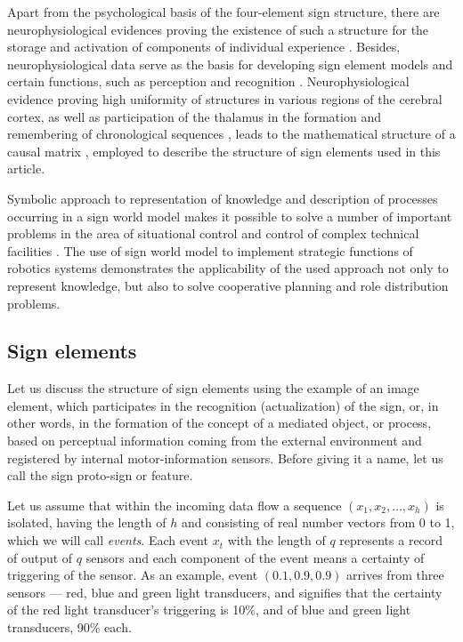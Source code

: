 \documentclass[review]{elsarticle}
\begin{document}
Apart from the psychological basis of the four-element sign structure, there are neurophysiological evidences proving the existence of such a structure for the storage and activation of components of individual experience \cite{Edelman1987,Ivanitsky1997}. Besides, neurophysiological data serve as the basis for developing sign element models and certain functions, such as perception and recognition \cite{George2009,Osipov2015d}. Neurophysiological evidence proving high uniformity of structures in various regions of the cerebral cortex, as well as participation of the thalamus in the formation and remembering of chronological sequences \cite{Buxhoeveden2002,Constantinople2013}, leads to the mathematical structure of a causal matrix \cite{Osipov2015d}, employed to describe the structure of sign elements used in this article.

Symbolic approach to representation of knowledge and description of processes occurring in a sign world model makes it possible to solve a number of important problems in the area of situational control \cite{Osipov1997a,Osipov1997b} and control of complex technical facilities \cite{Emelyanov2016}. The use of sign world model to implement strategic functions of robotics systems \cite{Emelyanov2016} demonstrates the applicability of the used approach not only to represent knowledge, but also to solve cooperative planning and role distribution problems.


\subsection{Sign elements}\label{subsec:components}

Let us discuss the structure of sign elements using the example of an image element, which participates in the recognition (actualization) of the sign, or, in other words, in the formation of the concept of a mediated object, or process, based on perceptual information coming from the external environment and registered by internal motor-information sensors. Before giving it a name, let us call the sign proto-sign or feature.

Let us assume that within the incoming data flow a sequence $(x_1,x_2,\dots,x_h)$ is isolated, having the length of $h$ and consisting of real number vectors from 0 to 1, which we will call \textit{events}. Each event $x_t$ with the length of $q$ represents a record of output of $q$ sensors and each component of the event means a certainty of triggering of the sensor. As an example, event $(0.1, 0.9, 0.9)$ arrives from three sensors --- red, blue and green light transducers, and signifies that the certainty of the red light transducer's triggering is 10\%, and of blue and green light transducers, 90\% each.
\end{document}
